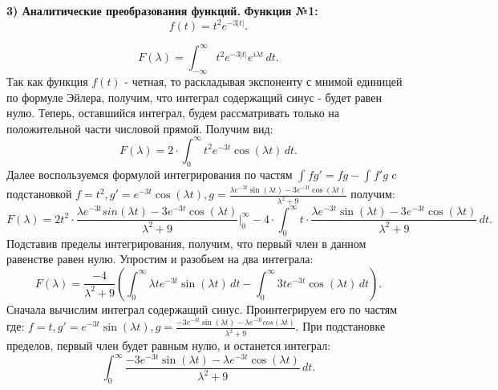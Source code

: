 \documentclass[11pt]{article}
\begin{document}
	\newpage
	
	{\vspace*{-2cm} \hspace{-1cm}\bf \Large  3) Аналитические преобразования функций.}
		\newline
	\newline
	{\hspace{-0.6cm}\bf Функция №1:}
	\newline
	\[ f(t) = t^{2}e^{-3|t|}.\]
	
	\[F(\lambda) = \int_{-\infty}^{\infty}t^2 e^{-3|t|} e^{i\lambda t}\,dt.\]
	\newline
	{\hspace{-0.6cm} Так как функция $f(t)$ - четная, то раскладывая экспоненту с мнимой единицей по формуле Эйлера, получим, что интеграл содержащий синус - будет равен нулю. Теперь, оставшийся интеграл, будем рассматривать только на положительной части числовой прямой. Получим вид: }
	\newline
	\[F(\lambda) = 2\cdot\int_{0}^{\infty}t^2 e^{-3t} \cos(\lambda t )\,dt.\]
	\newline
	{\hspace{-0.6cm} Далее воспользуемся формулой интегрирования по частям $\int_{}^{}fg' = fg - \int_{}^{}f'g$ c подстановкой $f = t^2,  g' = e^{-3t}\cos(\lambda t),  g =\frac{\lambda e^{-3t}\sin(\lambda t) - 3e^{-3t}\cos(\lambda t)}{\lambda^2 + 9}$ получим:}
	\[F(\lambda) = 2t^2\cdot\frac{\lambda e^{-3t}sin(\lambda t) - 3e^{-3t}\cos(\lambda t)}{\lambda^2 + 9}\bigg|_0^\infty - 4\cdot\int_{0}^{\infty}t\cdot\frac{\lambda e^{-3t}\sin(\lambda t) - 3e^{-3t}\cos(\lambda t)}{\lambda^2 + 9}\, dt.\]
	\newline
	{\hspace{-0.6cm} Подставив пределы интегрирования, получим, что первый член в данном равенстве равен нулю. Упростим и разобьем на два интеграла:}
	\newline
	\[F(\lambda) = \frac{-4}{\lambda^2 + 9}(\int_{0}^{\infty}\lambda te^{-3t}\sin(\lambda t)\,dt - \int_{0}^{\infty}3te^{-3t}\cos(\lambda t)\,dt).\]
	\newline
	{\hspace{-0.6cm} Сначала вычислим интеграл содержащий синус. Проинтегрируем его по частям где: \newline    
	$f = t, g' = e^{-3t}\sin(\lambda t), g = \frac{-3 e^{-3t}\sin(\lambda t) - \lambda e^{-3t}cos(\lambda t)}{\lambda^2 + 9}$. При подстановке пределов, первый член будет равным нулю, и останется интеграл:}
	\newline
	\[\int_{0}^{\infty}\frac{-3 e^{-3t}\sin(\lambda t) - \lambda e^{-3t}\cos(\lambda t)}{\lambda^2 + 9}\,dt.\]
\end{document}
